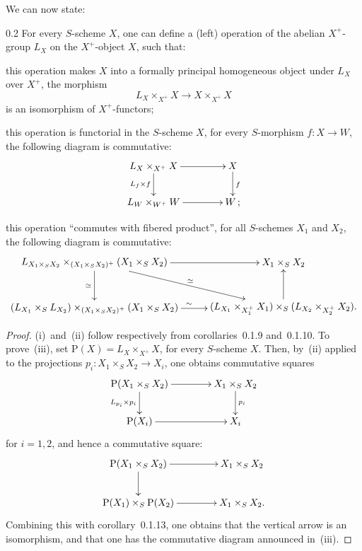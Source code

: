 We can now state:

\begin{proposition}{0.2}
\label{III.0.2}
For every \(S\)-scheme \(X\), one can define a (left) operation of the
abelian \(X^{+}\)-group \(L_{X}\) on the \(X^{+}\)-object \(X\),
such that:
\begin{enumeratei}
\item this operation makes \(X\) into a formally principal homogeneous
object under \(L_{X}\) over \(X^{+}\), \ie the morphism
\[
L_{X}\times_{X^{+}}X\longrightarrow X\times_{X^{+}}X
\]
is an isomorphism of \(X^{+}\)-functors;
\item this operation is functorial in the \(S\)-scheme \(X\), \ie for every
\(S\)-morphism \(f\colon X\to W\), the following diagram is commutative:
\[
\xymatrix@C=4em@R=2.2em{
L_{X}\times_{X^{+}}X
  \ar[r]
  \ar[d]_{L_{f}\times f}
& X
  \ar[d]^{f}
\\
L_{W}\times_{W^{+}}W
  \ar[r]
& W\,;
}
\]
\item this operation ``commutes with fibered product'', \ie for all
\(S\)-schemes \(X_{1}\) and \(X_{2}\), the following diagram is commutative:
\[
\xymatrix@C=1em@R=2.8em{
*+{L_{X_{1}\times_{S}X_{2}}\times_{(X_{1}\times_{S}X_{2})^{+}}(X_{1}\times_{S}X_{2})}
  \ar[rr]
  \ar[d]_{\simeq}
  \ar[drr]^{\simeq}
& & X_{1}\times_{S}X_{2}
\\
*+{(L_{X_{1}}\times_{S}L_{X_{2}})\times_{(X_{1}\times_{S}X_{2})^{+}}(X_{1}\times_{S}X_{2})}
  \ar[rr]^{\sim}
& & *+{(L_{X_{1}}\times_{X_{1}^{+}}X_{1})\times_{S}(L_{X_{2}}\times_{X_{2}^{+}}X_{2}).}
  \ar[u]
}
\]
\end{enumeratei}
\end{proposition}

\begin{proof}
{\renewcommand{\thefootnote}{(20)}}%
(i)~and~(ii) follow respectively from corollaries~0.1.9 and~0.1.10. To
prove~(iii), set \(\mathrm{P}(X)=L_{X}\times_{X^{+}}X\),
for every \(S\)-scheme \(X\). Then, by~(ii) applied to the projections
\(p_{i}\colon X_{1}\times_{S}X_{2}\to X_{i}\), one obtains commutative
squares
\[
\xymatrix@C=4em@R=2.2em{
\mathrm{P}(X_{1}\times_{S}X_{2})
  \ar[r]
  \ar[d]_{L_{p_{i}}\times p_{i}}
& X_{1}\times_{S}X_{2}
  \ar[d]^{p_{i}}
\\
\mathrm{P}(X_{i})
  \ar[r]
& X_{i}
}
\]
for \(i=1,2\), and hence a commutative square:
\[
\xymatrix@C=4em@R=2.4em{
\mathrm{P}(X_{1}\times_{S}X_{2})
  \ar[r]
  \ar[d]
& X_{1}\times_{S}X_{2}
\\
\mathrm{P}(X_{1})\times_{S}\mathrm{P}(X_{2})
  \ar[r]
& X_{1}\times_{S}X_{2}.
}
\]
Combining this with corollary~0.1.13, one obtains that the vertical arrow
is an isomorphism, and that one has the commutative diagram announced
in~(iii).
\end{proof}

